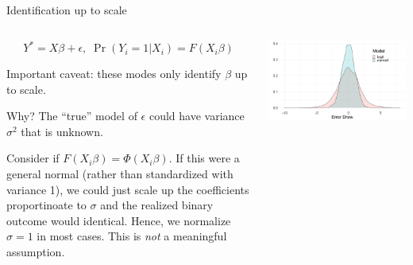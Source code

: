 \documentclass[notes,11pt, aspectratio=169]{beamer}
\newenvironment{wideitemize}{\itemize\addtolength{\itemsep}{10pt}}{\enditemize}
\begin{document}
  \begin{frame}{Identification up to scale}
  \begin{columns}[T] %
    \begin{column}{.6\textwidth}
  $$Y^{*} = X\beta + \epsilon,  \; \Pr(Y_{i} =1|X_{i}) = F(X_{i}\beta)  $$

  \begin{wideitemize}
  \item  Important caveat: these modes only identify $\beta$  up to scale.
  \item   Why?  The ``true'' model of $\epsilon$ could have variance
    $\sigma^{2}$ that is unknown.
  \item Consider if $F(X_{i}\beta) = \Phi(X_{i}\beta)$. If this were a
    general normal (rather than standardized with variance 1), we
    could just scale up the coefficients proportinoate to $\sigma$ and
    the realized binary outcome would identical.  Hence, we normalize
    $\sigma = 1$ in most cases. This is \emph{not} a meaningful
    assumption.
  \end{wideitemize}

    \end{column}%
  \hfill%
  \begin{column}{.4\textwidth}
    \begin{center}
      \includegraphics[width=\linewidth]{images/logit_v_normal.png}
    \end{center}
  \end{column}
\end{columns}
  \end{frame}
\end{document}
